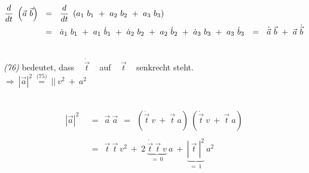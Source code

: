 \begin{flushleft}
\begin{align*}
	\frac{d}{dt} ~ \left( \vec{a} ~ \vec{b} \right) ~~ &= ~~ \frac{d}{dt} ~ \left( a_1 ~ b_1 ~ + ~ a_2 ~ b_2 ~ + ~ a_3 ~ b_3 \right) \\
	&= ~~ \dot{a}_1 ~ b_1 ~ + ~ a_1 ~ \dot{b}_1 ~ + ~ \dot{a}_2 ~ b_2 ~ + ~ a_2 ~ \dot{b}_2 ~ + ~ \dot{a}_3 ~ b_3 ~ + ~ a_3 ~ \dot{b}_3
	&= ~~ \dot{\vec{a}} ~ \vec{b} ~ + ~ \vec{a} ~ \dot{\vec{b}}
\end{align*}

\iec

~\\

\textit{(76)} bedeutet, dass ~ $\dot{\vec{t}}$ ~ auf ~ $\vec{t}$ ~ senkrecht steht. \\
$ \Rightarrow ~ \left| \vec{a} \right|^2 ~ \overset{\textit{(75)}}{=} ~ \left|  \right| ~ v^2 ~ + ~ a^2 $

\iec

~\\

\begin{align*}
	\left| \vec{a} \right|^2 ~~ &= ~~ \vec{a} ~ \vec{a} ~~ = ~~ \left( \dot{\vec{t}} ~ v ~ + ~ \vec{t} ~ a \right) ~ \left( \dot{\vec{t}} ~ v ~ + ~ \vec{t} ~ a \right) \\ \\
	&= ~~ \vec{t} ~ \vec{t} ~ v^2 ~ + ~ 2 ~ \underbrace{\dot{\vec{t}} ~ \vec{t} ~ v}_{= ~ 0} ~ a ~ + ~ \underbrace{\left| ~ \vec{t} ~ \right|^2}_{= ~ 1} ~ a^2
\end{align*}





\end{flushleft}